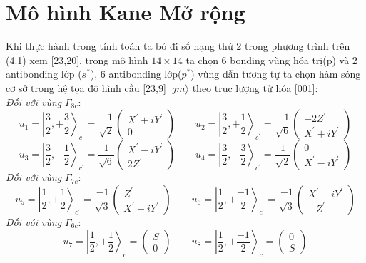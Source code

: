 \section{Mô hình Kane Mở rộng}
Khi thực hành trong tính toán ta bỏ đi số hạng thứ 2 trong phương trình trên (4.1) xem [23,20], trong mô hình $14\times14$ ta chọn 6 bonding vùng hóa trị(p) và 2 antibonding lớp ($s^*$), 6 antibonding lớp($p^*$) vùng dẫn tương tự ta chọn hàm sóng cơ sở trong hệ tọa độ hình cầu [23,9] $\vert jm\rangle $ theo trục lượng tử hóa [001]:\\
\emph{Đối với vùng} $\Gamma_{8c}$:
\[
u_1 = \left | \frac{3}{2},+\frac{3}{2}\right\rangle_{c^{'}}=\frac{-1}{\sqrt{2}}\left(
\begin{array}{cc}
X^{'} + iY^{'}\\
0
\end{array}
\right)
\qquad
u_2 = \left | \frac{3}{2},+\frac{1}{2}\right\rangle_{c^{'}}=\frac{-1}{\sqrt{6}}\left(
\begin{array}{cc}
-2Z^{'}\\
X^{'} + iY^{'}
\end{array}
\right)
\]
\[
u_3 = \left | \frac{3}{2},-\frac{1}{2}\right\rangle_{c^{'}}=\frac{1}{\sqrt{6}}\left(
\begin{array}{cc}
X^{'} - iY^{'}\\
2Z^{'}
\end{array}
\right)
\qquad
u_4 = \left | \frac{3}{2},-\frac{3}{2}\right\rangle_{c^{'}}=\frac{1}{\sqrt{2}}\left(
\begin{array}{cc}
0 \\
X^{'} - iY^{'}
\end{array}
\right)
\]
\emph{Đối với vùng} $\Gamma_{7c}$:
\[
u_5 = \left | \frac{1}{2},+\frac{1}{2}\right\rangle_{c^{'}}=\frac{-1}{\sqrt{3}}\left(
\begin{array}{cc}
Z^{'}\\
X^{'} + iY^{'}
\end{array}
\right)
\qquad
u_6= \left | \frac{1}{2},+\frac{-1}{2}\right\rangle_{c^{'}}=\frac{-1}{\sqrt{3}}\left(
\begin{array}{cc}
X^{'} - iY^{'}\\
-Z^{'}
\end{array}
\right)
\]
\emph{Đối vói vùng} $\Gamma_{6c}$:
\[
u_7 = \left | \frac{1}{2},+\frac{1}{2}\right\rangle_{c}=\left(
\begin{array}{cc}
S\\
0\end{array}
\right)
\qquad
u_8= \left | \frac{1}{2},+\frac{-1}{2}\right\rangle_{c}=\left(
\begin{array}{cc}
0\\
S
\end{array}
\right)
\]
